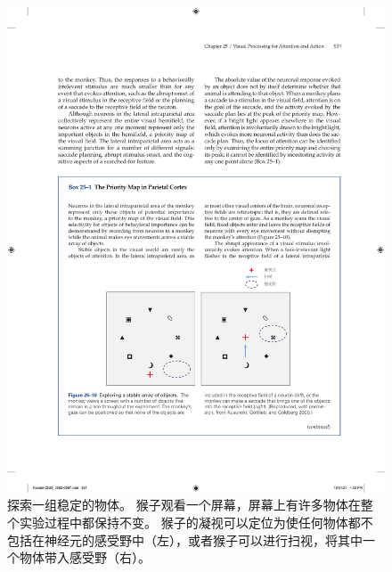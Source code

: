 \begin{figure}[htbp]
	\centering
	\includegraphics[width=0.83\linewidth]{chap25/fig_25_10}
	\caption{探索一组稳定的物体。
		猴子观看一个屏幕，屏幕上有许多物体在整个实验过程中都保持不变。
		猴子的凝视可以定位为使任何物体都不包括在神经元的感受野中（左），或者猴子可以进行扫视，将其中一个物体带入感受野（右）。}
	\label{fig:25_10}
\end{figure}


